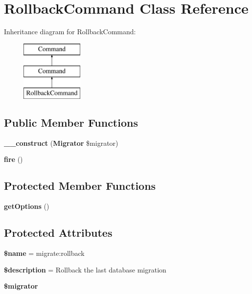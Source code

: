 \section{Rollback\+Command Class Reference}
\label{class_illuminate_1_1_database_1_1_console_1_1_migrations_1_1_rollback_command}
Inheritance diagram for Rollback\+Command\+:\begin{figure}[H]
\begin{center}
\leavevmode
\includegraphics[height=3.000000cm]{class_illuminate_1_1_database_1_1_console_1_1_migrations_1_1_rollback_command}
\end{center}
\end{figure}
\subsection*{Public Member Functions}
\begin{DoxyCompactItemize}
\item 
{\bf \+\_\+\+\_\+construct} ({\bf Migrator} \$migrator)
\item 
{\bf fire} ()
\end{DoxyCompactItemize}
\subsection*{Protected Member Functions}
\begin{DoxyCompactItemize}
\item 
{\bf get\+Options} ()
\end{DoxyCompactItemize}
\subsection*{Protected Attributes}
\begin{DoxyCompactItemize}
\item 
{\bf \$name} = \textquotesingle{}migrate\+:rollback\textquotesingle{}
\item 
{\bf \$description} = \textquotesingle{}Rollback the last database migration\textquotesingle{}
\item 
{\bf \$migrator}
\end{DoxyCompactItemize}


